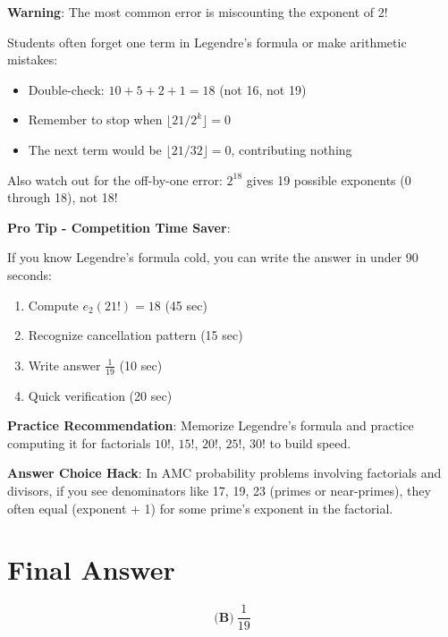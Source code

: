 \documentclass[]{article}
\begin{document}
\begin{warningbox}
\textbf{Warning}: The most common error is miscounting the exponent of 2!

Students often forget one term in Legendre's formula or make arithmetic mistakes:
\begin{itemize}[leftmargin=*]
    \item Double-check: $10 + 5 + 2 + 1 = 18$ (not 16, not 19)
    \item Remember to stop when $\lfloor 21/2^k \rfloor = 0$
    \item The next term would be $\lfloor 21/32 \rfloor = 0$, contributing nothing
\end{itemize}

Also watch out for the off-by-one error: $2^{18}$ gives 19 possible exponents (0 through 18), not 18!
\end{warningbox}

\begin{tipbox}
\textbf{Pro Tip - Competition Time Saver}: 

If you know Legendre's formula cold, you can write the answer in under 90 seconds:
\begin{enumerate}
    \item Compute $e_2(21!) = 18$ (45 sec)
    \item Recognize cancellation pattern (15 sec)
    \item Write answer $\frac{1}{19}$ (10 sec)
    \item Quick verification (20 sec)
\end{enumerate}

\textbf{Practice Recommendation}: Memorize Legendre's formula and practice computing it for factorials $10!$, $15!$, $20!$, $25!$, $30!$ to build speed.

\textbf{Answer Choice Hack}: In AMC probability problems involving factorials and divisors, if you see denominators like 17, 19, 23 (primes or near-primes), they often equal (exponent + 1) for some prime's exponent in the factorial.
\end{tipbox}

\section*{Final Answer}
\[\boxed{\textbf{(B)}\ \frac{1}{19}}\]
\end{document}

